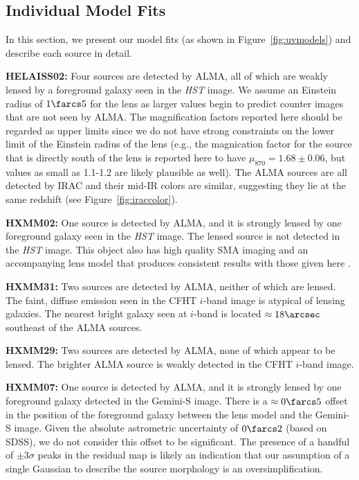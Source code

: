 \documentclass[iop]{emulateapj}
\begin{document}
\subsection{Individual Model Fits}\label{sec:objectbyobject}

In this section, we present our model fits (as shown in
Figure~\ref{fig:uvmodels}) and describe each source in detail.

{\bf HELAISS02:} Four sources are detected by ALMA, all of which are weakly
lensed by a foreground galaxy seen in the {\it HST} image.  We assume an
Einstein radius of $1\farcs5$ for the lens as larger values begin to predict
counter images that are not seen by ALMA.  The magnification factors reported
here should be regarded as upper limits since we do not have strong constraints
on the lower limit of the Einstein radius of the lens (e.g., the magnication
factor for the source that is directly south of the lens is reported here to
have $\mu_{870} = 1.68 \pm 0.06$, but values as small as 1.1-1.2 are likely
plausible as well).  The ALMA sources are all detected by IRAC and their mid-IR
colors are similar, suggesting they lie at the same redshift (see
Figure~\ref{fig:iraccolor}).

{\bf HXMM02:} One source is detected by ALMA, and it is strongly lensed by one
foreground galaxy seen in the {\it HST} image.  The lensed source is not
detected in the {\it HST} image.  This object also has high quality SMA imaging
and an accompanying lens model that produces consistent results with those
given here \citep{Bussmann:2013lr}.

{\bf HXMM31:} Two sources are detected by ALMA, neither of which are lensed.
The faint, diffuse emission seen in the CFHT $i$-band image is atypical of
lensing galaxies.  The nearest bright galaxy seen at $i$-band is located
$\approx 18\arcsec$ southeast of the ALMA sources.

{\bf HXMM29:} Two sources are detected by ALMA, none of which appear to be
lensed.  The brighter ALMA source is weakly detected in the CFHT $i$-band
image.  

{\bf HXMM07:} One source is detected by ALMA, and it is strongly lensed by one
foreground galaxy detected in the Gemini-S image.  There is a $\approx
0\farcs5$ offset in the position of the foreground galaxy between the lens
model and the Gemini-S image.  Given the absolute astrometric uncertainty of
$0\farcs2$ (based on SDSS), we do not consider this offset to be significant.
The presence of a handful of $\pm3\sigma$ peaks in the residual map is likely
an indication that our assumption of a single Gaussian to describe the source
morphology is an oversimplification.
\end{document}
